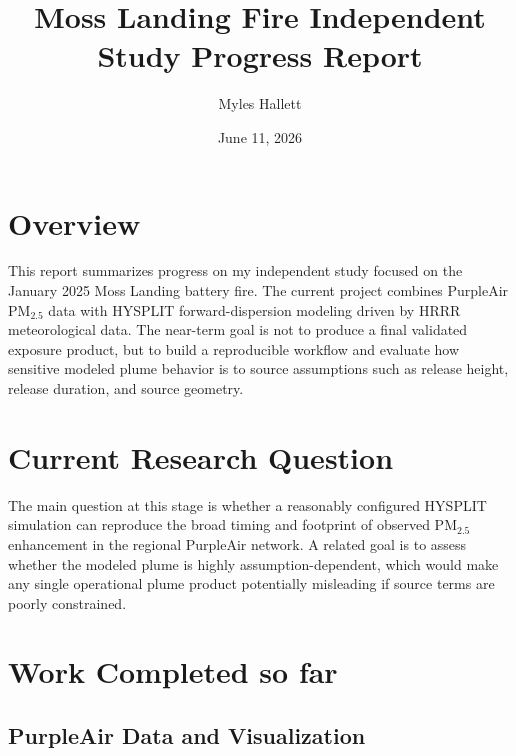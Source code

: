 \documentclass[11pt]{article}
\title{Moss Landing Fire Independent Study Progress Report}
\author{Myles Hallett}
\date{June 11, 2026}
\begin{document}
\maketitle

\section*{Overview}

This report summarizes progress on my independent study focused on the January 2025 Moss Landing battery fire. The current project combines PurpleAir PM$_{2.5}$ data with HYSPLIT forward-dispersion modeling driven by HRRR meteorological data. The near-term goal is not to produce a final validated exposure product, but to build a reproducible workflow and evaluate how sensitive modeled plume behavior is to source assumptions such as release height, release duration, and source geometry.

\section*{Current Research Question}

The main question at this stage is whether a reasonably configured HYSPLIT simulation can reproduce the broad timing and footprint of observed PM$_{2.5}$ enhancement in the regional PurpleAir network. A related goal is to assess whether the modeled plume is highly assumption-dependent, which would make any single operational plume product potentially misleading if source terms are poorly constrained.

\section*{Work Completed so far}

\subsection*{PurpleAir Data and Visualization}
\end{document}
